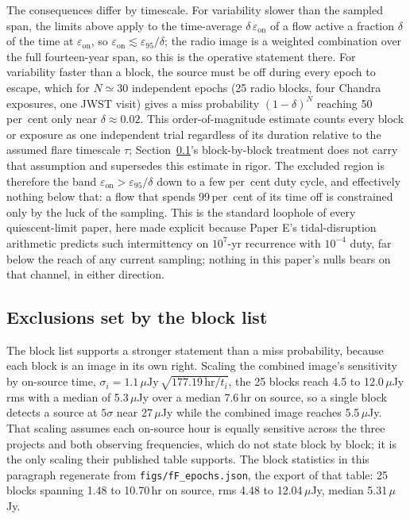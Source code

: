 \documentclass[11pt]{article}
\newcommand{\epsl}{\ensuremath{\varepsilon_{95}}}
\begin{document}
The consequences differ by timescale. For variability slower than the sampled span, the limits above apply to the time-average $\delta\,\varepsilon_{\mathrm{on}}$ of a flow active a fraction $\delta$ of the time at $\varepsilon_{\mathrm{on}}$, so $\varepsilon_{\mathrm{on}} \lesssim \epsl/\delta$; the radio image is a weighted combination over the full fourteen-year span, so this is the operative statement there. For variability faster than a block, the source must be off during every epoch to escape, which for $N \simeq 30$ independent epochs (25 radio blocks, four Chandra exposures, one JWST visit) gives a miss probability $(1-\delta)^{N}$ reaching 50\,per~cent only near $\delta \approx 0.02$. This order-of-magnitude estimate counts every block or exposure as one independent trial regardless of its duration relative to the assumed flare timescale $\tau$; Section~\ref{sec:dutyquant}'s block-by-block treatment does not carry that assumption and supersedes this estimate in rigor. The excluded region is therefore the band $\varepsilon_{\mathrm{on}} > \epsl/\delta$ down to a few per~cent duty cycle, and effectively nothing below that: a flow that spends 99\,per~cent of its time off is constrained only by the luck of the sampling. This is the standard loophole of every quiescent-limit paper, here made explicit because Paper E's tidal-disruption arithmetic predicts such intermittency on $10^{7}$-yr recurrence with $10^{-4}$ duty, far below the reach of any current sampling; nothing in this paper's nulls bears on that channel, in either direction.

\subsection{Exclusions set by the block list}
\label{sec:dutyquant}

The block list supports a stronger statement than a miss probability, because each block is an image in its own right. Scaling the combined image's sensitivity by on-source time, $\sigma_{i} = 1.1\,\mu\mathrm{Jy}\,\sqrt{177.19\,\mathrm{hr}/t_{i}}$, the 25 blocks reach 4.5 to 12.0\,$\mu$Jy rms with a median of 5.3\,$\mu$Jy over a median 7.6\,hr on source, so a single block detects a source at $5\sigma$ near 27\,$\mu$Jy while the combined image reaches 5.5\,$\mu$Jy. That scaling assumes each on-source hour is equally sensitive across the three projects and both observing frequencies, which \citet{Mahida2026} do not state block by block; it is the only scaling their published table supports. The block statistics in this paragraph regenerate from \texttt{figs/fF\_epochs.json}, the export of that table: 25 blocks spanning 1.48 to 10.70\,hr on source, rms 4.48 to 12.04\,$\mu$Jy, median 5.31\,$\mu$Jy.
\end{document}

